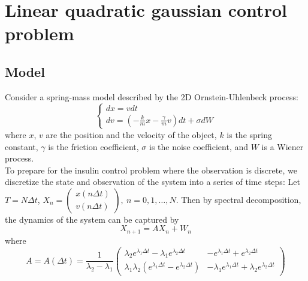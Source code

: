 \documentclass{article}
\begin{document}
\section{Linear quadratic gaussian control problem}
\subsection{Model}
Consider a spring-mass model described by the 2D Ornstein-Uhlenbeck process:
\[
\begin{cases}
	dx = vdt \\ dv = (-\frac{k}{m}x - \frac{\gamma}{m}v)dt + \sigma dW 
\end{cases}
\]
where $x$, $v$ are the position and the velocity of the object, $k$ is the spring constant, $\gamma$ is the friction coefficient, $\sigma$ is the noise coefficient, and $W$ is a Wiener process. \\
To prepare for the insulin control problem where the observation is discrete, we discretize the state and observation of the system into a series of time steps: Let $T = N\Delta t$, $X_n = \begin{pmatrix}x(n\Delta t)\\v(n\Delta t)\end{pmatrix}, \ n = 0,1,\dots, N$. Then by spectral decomposition, the dynamics of the system can be captured by
\begin{equation*}
X_{n+1} = AX_n + W_n
\end{equation*}
where 
\begin{equation*}
A = A(\Delta t) = \frac{1}{\lambda_{2}-\lambda_{1}}\left(\begin{array}{ll}{\lambda_{2} e^{\lambda_{1} \Delta t}-\lambda_{1} e^{\lambda_{2} \Delta t}} & {-e^{\lambda_{1} \Delta t}+e^{\lambda_{2} \Delta t}} \\ {\lambda_{1} \lambda_{2}\left(e^{\lambda_{1} \Delta t}-e^{\lambda_{2} \Delta t}\right)} & {-\lambda_{1} e^{\lambda_{1} \Delta t}+\lambda_{2} e^{\lambda_{2} \Delta t}}\end{array}\right) 
\end{equation*}
\end{document}
